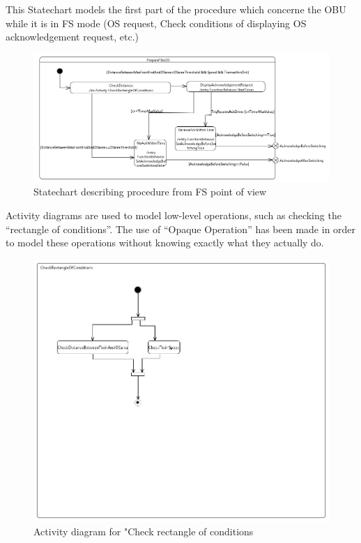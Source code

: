 \documentclass{template/openetcs_article}
\begin{document}
This Statechart models the first part of the procedure which concerne the OBU while it is in FS mode (OS request, Check conditions of displaying OS acknowledgement request, etc.)

\begin{figure}[h]
  \centering
  \includegraphics[width=14cm]{fig7_statechart_procedure.png}
  \caption{Statechart describing procedure from FS point of view}
  \label{fig: Statechart describing procedure from FS point of view}
\end{figure}

Activity diagrams are used to model low-level operations, such as checking the “rectangle of conditions”. The use of “Opaque Operation” has been made in order to model these operations without knowing exactly what they actually do.

\begin{figure}[h!]
  \centering
  \includegraphics[width=14cm]{fig8_activity_diagram_check_conditions.png}
  \caption{Activity diagram for "Check rectangle of conditions}
  \label{fig: Activity diagram for "Check rectangle of conditions}
\end{figure}
\end{document}
